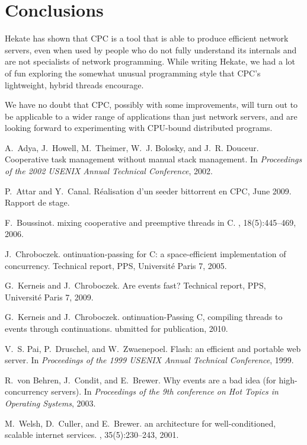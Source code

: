 \documentclass{easychair}
\begin{document}
\section{Conclusions}

Hekate has shown that CPC is a tool that is able to produce efficient
network servers, even when used by people who do not fully understand
its internals and are not specialists of network programming.  While
writing Hekate, we had a lot of fun exploring the somewhat unusual
programming style that CPC's lightweight, hybrid threads encourage.

We have no doubt that CPC, possibly with some improvements, will turn
out to be applicable to a wider range of applications than just network
servers, and are looking forward to experimenting with CPU-bound
distributed programs.


\label{sect:bib}
\begin{thebibliography}{1}

A.~Adya, J.~Howell, M.~Theimer, W.~J. Bolosky, and J.~R. Douceur.
\newblock Cooperative task management without manual stack management.
\newblock In {\em Proceedings of the 2002 {USENIX} Annual Technical
  Conference}, 2002.

P.~Attar and Y.~Canal.
\newblock R\'ealisation d'un seeder bittorrent en {CPC}, June 2009.
\newblock Rapport de stage.

F.~Boussinot.
 mixing cooperative and preemptive threads in {C}.
,
  18(5):445--469, 2006.

J.~Chroboczek.
ontinuation-passing for {C}: a space-efficient implementation of
  concurrency.
\newblock Technical report, {PPS,} Universit\'e Paris 7, 2005.

G.~Kerneis and J.~Chroboczek.
\newblock Are events fast?
\newblock Technical report, {PPS,} Universit\'e Paris 7, 2009.

G.~{K}erneis and J.~{C}hroboczek.
ontinuation-{P}assing {C}, compiling threads to events through
  continuations.
ubmitted for publication, 2010.

V.~S. Pai, P.~Druschel, and W.~Zwaenepoel.
\newblock Flash: an efficient and portable web server.
\newblock In {\em Proceedings of the 1999 {USENIX} Annual Technical
  Conference}, 1999.

R.~von Behren, J.~Condit, and E.~Brewer.
\newblock Why events are a bad idea (for high-concurrency servers).
\newblock In {\em Proceedings of the 9th conference on Hot Topics in Operating
  Systems}, 2003.

M.~Welsh, D.~Culler, and E.~Brewer.
 an architecture for well-conditioned, scalable internet
  services.
, 35(5):230--243, 2001.

\end{thebibliography}
\end{document}
